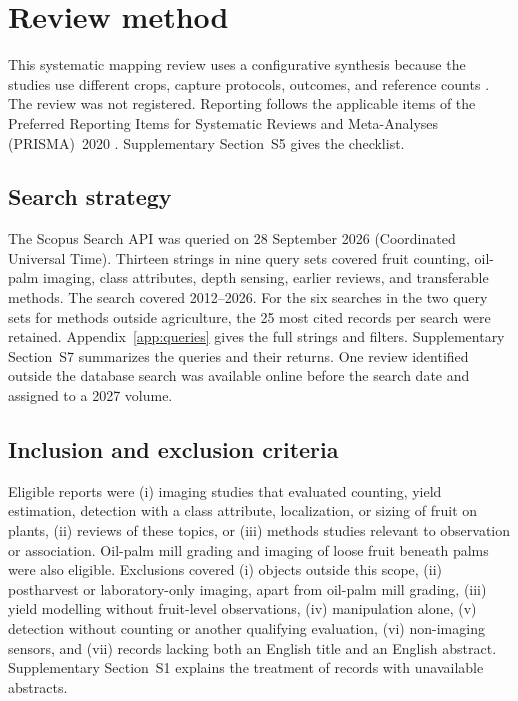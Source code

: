 \section{Review method}\label{sec:method}

This systematic mapping review uses a configurative synthesis because the studies use different crops, capture protocols, outcomes, and reference counts \citep{petersen2015mapping,grant2009typology}. The review was not registered. Reporting follows the applicable items of the Preferred Reporting Items for Systematic Reviews and Meta-Analyses (PRISMA)~2020 \citep{page2021prisma,page2021elaboration}. Supplementary Section~S5 gives the checklist.

\subsection{Search strategy}
The Scopus Search API was queried on 28 September 2026 (Coordinated Universal Time). Thirteen strings in nine query sets covered fruit counting, oil-palm imaging, class attributes, depth sensing, earlier reviews, and transferable methods. The search covered 2012--2026. For the six searches in the two query sets for methods outside agriculture, the 25 most cited records per search were retained. Appendix~\ref{app:queries} gives the full strings and filters. Supplementary Section~S7 summarizes the queries and their returns. One review identified outside the database search was available online before the search date and assigned to a 2027 volume.

\subsection{Inclusion and exclusion criteria}\label{sec:criteria}
Eligible reports were (i) imaging studies that evaluated counting, yield estimation, detection with a class attribute, localization, or sizing of fruit on plants, (ii) reviews of these topics, or (iii) methods studies relevant to observation or association. Oil-palm mill grading and imaging of loose fruit beneath palms were also eligible. Exclusions covered (i) objects outside this scope, (ii) postharvest or laboratory-only imaging, apart from oil-palm mill grading, (iii) yield modelling without fruit-level observations, (iv) manipulation alone, (v) detection without counting or another qualifying evaluation, (vi) non-imaging sensors, and (vii) records lacking both an English title and an English abstract. Supplementary Section~S1 explains the treatment of records with unavailable abstracts.

